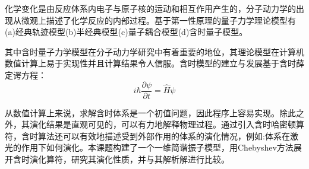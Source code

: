 
化学变化是由反应体系内电子与原子核的运动和相互作用产生的，分子动力学的出现从微观上描述了化学反应的内部过程。基于第一性原理的量子力学理论模型有(a)经典轨迹模型(b)半经典模型(c)量子耦合模型(d)含时量子模型。

其中含时量子力学模型在分子动力学研究中有着重要的地位，其理论模型在计算机数值计算上易于实现性并且计算结果令人信服。含时模型的建立与发展基于含时薛定谔方程：
\begin{equation}
  i \hbar \frac{\partial \psi}{\partial t} = \hat{H} \psi  
\end{equation} 

从数值计算上来说，求解含时体系是一个初值问题，因此程序上容易实现。除此之外，其演化结果是直观可见的，可以有力地解释物理过程。通过引入含时哈密顿算符，含时算法还可以有效地描述受到外部作用的体系的演化情况，例如:体系在激光的作用下如何演化。本课题构建了一个一维简谐振子模型，用Chebyshev方法展开含时演化算符，研究其演化性质，并与其解析解进行比较。